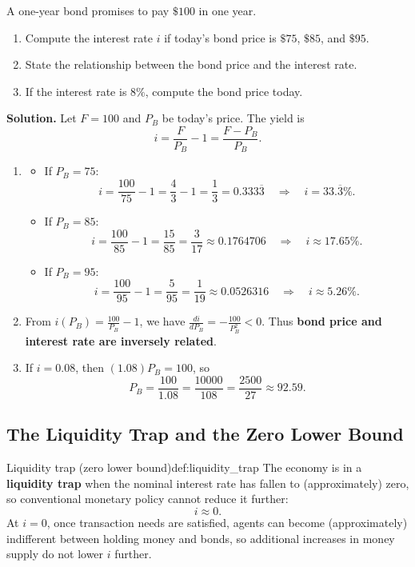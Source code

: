 \begin{examplebox}[title={Worked Example (Tutorial 2, Question 4): Bond pricing and yields}]
A one-year bond promises to pay $\$100$ in one year.
\begin{enumerate}[label=(\alph*)]
  \item Compute the interest rate $i$ if today's bond price is $\$75$, $\$85$, and $\$95$.
  \item State the relationship between the bond price and the interest rate.
  \item If the interest rate is $8\%$, compute the bond price today.
\end{enumerate}

\textbf{Solution.}
Let $F=100$ and $P_B$ be today's price. The yield is
\[
i=\frac{F}{P_B}-1=\frac{F-P_B}{P_B}.
\]

\begin{enumerate}[label=(\alph*)]
  \item
  \begin{itemize}
    \item If $P_B=75$:
    \[
    i=\frac{100}{75}-1=\frac{4}{3}-1=\frac{1}{3}=0.333\overline{3}
    \quad\Rightarrow\quad
    i=33.\overline{3}\%.
    \]
    \item If $P_B=85$:
    \[
    i=\frac{100}{85}-1=\frac{15}{85}=\frac{3}{17}\approx 0.1764706
    \quad\Rightarrow\quad
    i\approx 17.65\%.
    \]
    \item If $P_B=95$:
    \[
    i=\frac{100}{95}-1=\frac{5}{95}=\frac{1}{19}\approx 0.0526316
    \quad\Rightarrow\quad
    i\approx 5.26\%.
    \]
  \end{itemize}

  \item From $i(P_B)=\frac{100}{P_B}-1$, we have $\frac{di}{dP_B}=-\frac{100}{P_B^2}<0$.
  Thus \textbf{bond price and interest rate are inversely related}.

  \item If $i=0.08$, then $(1.08)P_B=100$, so
  \[
  P_B=\frac{100}{1.08}=\frac{10000}{108}=\frac{2500}{27}\approx 92.59.
  \]
\end{enumerate}
\end{examplebox}


\newpage
\subsection{The Liquidity Trap and the Zero Lower Bound}

\begin{definition}{Liquidity trap (zero lower bound)}{def:liquidity_trap}
The economy is in a \textbf{liquidity trap} when the nominal interest rate has fallen to (approximately) zero,
so conventional monetary policy cannot reduce it further:
\[
i \approx 0.
\]
At $i=0$, once transaction needs are satisfied, agents can become (approximately) indifferent between holding money and bonds,
so additional increases in money supply do not lower $i$ further.
\end{definition}

